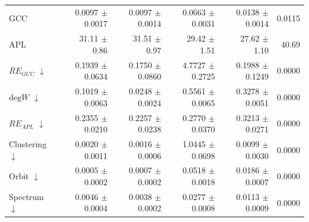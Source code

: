 \begin{table}[H]
\begin{tabular}{lrrrrr}
GCC                           & 0.0097 $\pm$ 0.0017 & 0.0097 $\pm$ 0.0014 & 0.0663 $\pm$ 0.0031 & 0.0138 $\pm$ 0.0014 & 0.0115 \\
APL                           & 31.11 $\pm$ 0.86 & 31.51 $\pm$ 0.97 & 29.42 $\pm$ 1.51 & 27.62 $\pm$ 1.10 & 40.69 \\
\midrule
$RE_{GCC}$ $\downarrow$       & 0.1939 $\pm$ 0.0634 & 0.1750 $\pm$ 0.0860 & 4.7727 $\pm$ 0.2725 & 0.1988 $\pm$ 0.1249 & 0.0000 \\
$\mathrm{deg}W$ $\downarrow$  & 0.1019 $\pm$ 0.0063 & 0.0248 $\pm$ 0.0024 & 0.5561 $\pm$ 0.0065 & 0.3278 $\pm$ 0.0051 & 0.0000 \\
$RE_{APL}$ $\downarrow$       & 0.2355 $\pm$ 0.0210 & 0.2257 $\pm$ 0.0238 & 0.2770 $\pm$ 0.0370 & 0.3213 $\pm$ 0.0271 & 0.0000 \\
Clustering $\downarrow$       & 0.0020 $\pm$ 0.0011 & 0.0016 $\pm$ 0.0006 & 1.0445 $\pm$ 0.0698 & 0.0099 $\pm$ 0.0030 & 0.0000 \\
Orbit $\downarrow$            & 0.0005 $\pm$ 0.0002 & 0.0007 $\pm$ 0.0002 & 0.0518 $\pm$ 0.0018 & 0.0186 $\pm$ 0.0007 & 0.0000 \\
Spectrum $\downarrow$         & 0.0046 $\pm$ 0.0004 & 0.0038 $\pm$ 0.0002 & 0.0277 $\pm$ 0.0008 & 0.0113 $\pm$ 0.0009 & 0.0000 \\
\bottomrule
\end{tabular}
\end{table}
